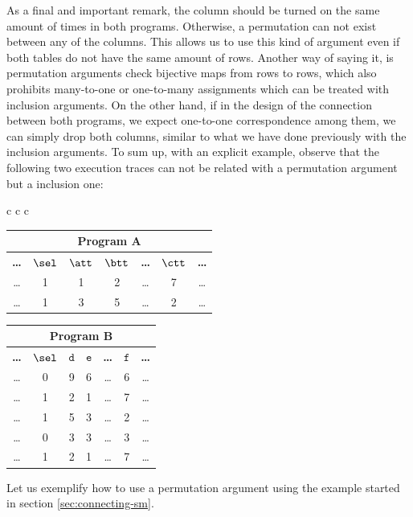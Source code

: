 As a final and important remark, the \SEL column should be turned on the same amount of times in both programs. Otherwise, a permutation can not exist between any of the columns. This allows us to use this kind of argument even if both tables do not have the same amount of rows. Another way of saying it, is permutation arguments check bijective maps from rows to rows, which also prohibits many-to-one or one-to-many assignments which can be treated with inclusion arguments. On the other hand, if in the design of the connection between both programs, we expect one-to-one correspondence among them, we can simply drop both \SEL columns, similar to what we have done previously with the inclusion arguments. To sum up, with an explicit example, observe that the following two execution traces can not be related with a permutation argument but a inclusion one:

\vspace{.5cm}
\begin{tabular}{ c c c }
    
\begin{tabular}{|c|c|c|c|c|c|c|}
\hline
\multicolumn{7}{|c|}{\textbf{Program A}} \\
\hline
\textbf{\dots} &$\sel$	&$\att$	&$\btt$	&\textbf{\dots}	&$\ctt$	&\textbf{\dots}	\\ \hline
\dots	&1	&1	&2	&\dots	&7	&\dots \\
\dots	&1	&3	&5	&\dots	&2	&\dots \\
\hline
\end{tabular}

\quad 

\begin{tabular}{|c|c|c|c|c|c|c|}
\hline
\multicolumn{7}{|c|}{\textbf{Program B}} \\
\hline
\textbf{\dots} &$\sel$	&$\mathtt{d}$	&$\mathtt{e}$	&\textbf{\dots}	&$\mathtt{f}$	&\textbf{\dots}	\\ \hline
\dots	&0	&9	&6	&\dots	&6	&\dots \\
\dots	&1	&2	&1	&\dots	&7	&\dots \\
\dots	&1	&5	&3	&\dots	&2	&\dots \\
\dots	&0	&3	&3	&\dots	&3	&\dots \\
\dots	&1	&2	&1	&\dots	&7	&\dots \\
\hline
\end{tabular}
\end{tabular}
\vspace{.5cm}

Let us exemplify how to use a permutation argument using the example started in section \ref{sec:connecting-sm}. 


